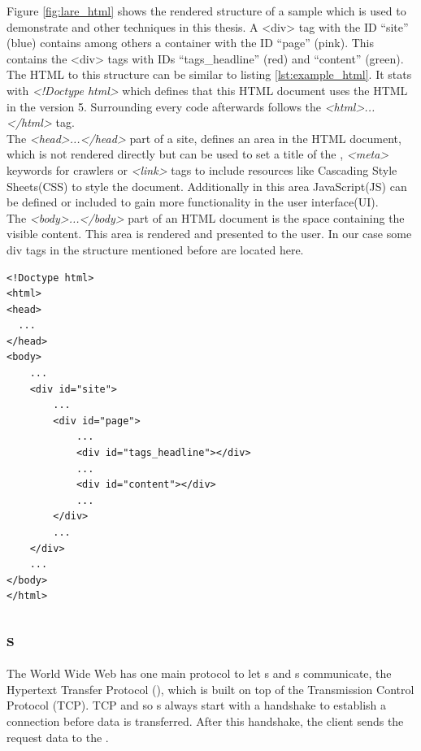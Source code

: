 \noindent{}Figure \ref{fig:lare_html} shows the rendered structure of a sample \webApplication{} which is used to demonstrate \lare{} and other techniques in this thesis.
A <div> tag with the ID \enquote{site} (blue) contains among others a container with the ID \enquote{page} (pink).
This contains the <div> tags with IDs \enquote{tags\_headline} (red) and \enquote{content} (green).
\\
The HTML to this structure can be similar to listing \ref{lst:example_html}. It stats with \emph{<!Doctype html>} which defines that this HTML document uses the HTML in the version 5.
Surrounding every code afterwards follows the \emph{<html>...</html>} tag.
\\
The \emph{<head>...</head>} part of a site, defines an area in the HTML document, which is not rendered directly but can be used to set a title of the \webPage{}, \emph{<meta>} keywords for crawlers or \emph{<link>} tags to include resources like Cascading Style Sheets(CSS) to style the document.
Additionally in this area JavaScript(JS) can be defined or included to gain more functionality in the user interface(UI).
\\
The \emph{<body>...</body>} part of an HTML document is the space containing the visible content.
This area is rendered and presented to the user.
In our case some div tags in the structure mentioned before are located here.

\begin{minipage}[c]{0.95\linewidth}
\begin{lstlisting}[caption=Sample HTML document, label=lst:example_html]
<!Doctype html>
<html>
<head>
  ...
</head>
<body>
    ...
    <div id="site">
        ...
        <div id="page">
            ...
            <div id="tags_headline"></div>
            ...
            <div id="content"></div>
            ...
        </div>
        ...
    </div>
    ...
</body>
</html>
\end{lstlisting}
\end{minipage}

\subsection{\httpRequest{}s\label{httpRequest}}
The World Wide Web has one main protocol to let \webBrowser{}s and \webServer{}s communicate, the Hypertext Transfer Protocol (\http{}), which is built on top of the Transmission Control Protocol (TCP).
TCP and so \httpRequest{}s always start with a handshake to establish a connection before data is transferred.
After this handshake, the client sends the request data to the \webServer{}.

